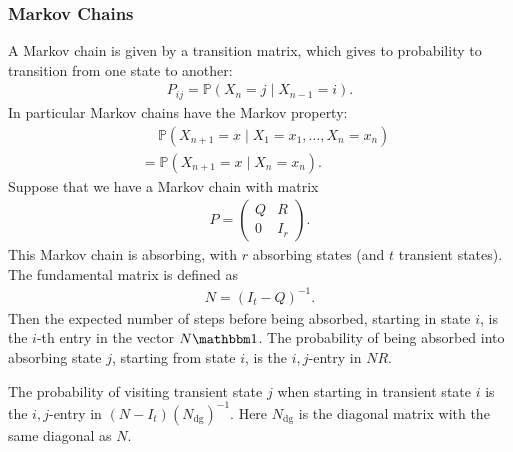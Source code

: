 \subsubsection{Markov Chains}
A Markov chain is given by a transition matrix, which gives to probability to transition from one state to another:
\begin{align*}
    P_{ij} = \mathbb P(X_n = j \mid X_{n-1} = i).
\end{align*}
In particular Markov chains have the Markov property:
\begin{align*}
    &\quad\ \mathbb P(X_{n+1} = x \mid X_1 = x_1, \dots, X_n = x_n) \\
    &= \mathbb P(X_{n+1} = x \mid X_n = x_n).
\end{align*}
Suppose that we have a Markov chain with matrix
\begin{align*}
    P = \left(\begin{array}{cc}
        Q & R \\
        0 & I_r
    \end{array}\right).
\end{align*}
This Markov chain is absorbing, with $r$ absorbing states (and $t$ transient states). The fundamental matrix is defined as
\begin{align*}
    N = (I_t - Q)^{-1}.
\end{align*}
Then the expected number of steps before being absorbed, starting in state $i$, is the $i$-th entry in the vector $N\mathbbm 1$. The probability of being absorbed into absorbing state $j$, starting from state $i$, is the $i,j$-entry in $NR$.

The probability of visiting transient state $j$ when starting in transient state $i$ is the $i,j$-entry in $(N - I_t)(N_{\text{dg}})^{-1}$. Here $N_{\text{dg}}$ is the diagonal matrix with the same diagonal as $N$.


